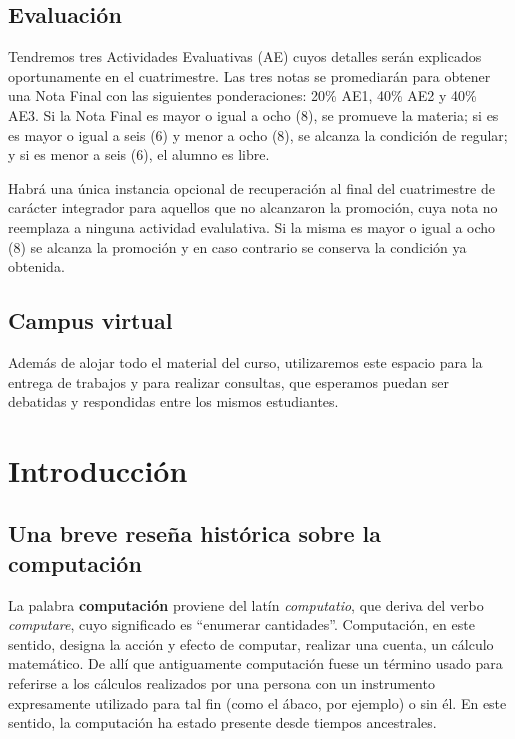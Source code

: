\documentclass[
]{book}
\begin{document}
\hypertarget{evaluaciuxf3n}{%
\section*{Evaluación}\label{evaluaciuxf3n}}

Tendremos tres Actividades Evaluativas (AE) cuyos detalles serán explicados oportunamente en el cuatrimestre. Las tres notas se promediarán para obtener una Nota Final con las siguientes ponderaciones: 20\% AE1, 40\% AE2 y 40\% AE3. Si la Nota Final es mayor o igual a ocho (8), se promueve la materia; si es es mayor o igual a seis (6) y menor a ocho (8), se alcanza la condición de regular; y si es menor a seis (6), el alumno es libre.

Habrá una única instancia opcional de recuperación al final del cuatrimestre de carácter integrador para aquellos que no alcanzaron la promoción, cuya nota no reemplaza a ninguna actividad evalulativa. Si la misma es mayor o igual a ocho (8) se alcanza la promoción y en caso contrario se conserva la condición ya obtenida.

\hypertarget{campus-virtual}{%
\section*{Campus virtual}\label{campus-virtual}}

Además de alojar todo el material del curso, utilizaremos este espacio para la entrega de trabajos y para realizar consultas, que esperamos puedan ser debatidas y respondidas entre los mismos estudiantes.

\hypertarget{introducciuxf3n}{%
\chapter{Introducción}\label{introducciuxf3n}}

\hypertarget{una-breve-reseuxf1a-histuxf3rica-sobre-la-computaciuxf3n}{%
\section{Una breve reseña histórica sobre la computación}\label{una-breve-reseuxf1a-histuxf3rica-sobre-la-computaciuxf3n}}

La palabra \textbf{computación} proviene del latín \emph{computatio}, que deriva del verbo \emph{computare}, cuyo significado es ``enumerar cantidades''. Computación, en este sentido, designa la acción y efecto de computar, realizar una cuenta, un cálculo matemático. De allí que antiguamente computación fuese un término usado para referirse a los cálculos realizados por una persona con un instrumento expresamente utilizado para tal fin (como el ábaco, por ejemplo) o sin él. En este sentido, la computación ha estado presente desde tiempos ancestrales.
\end{document}
